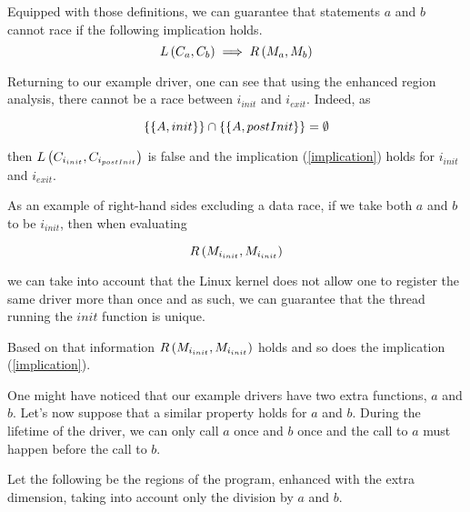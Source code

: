 \documentclass[..thesis.tex]{subfiles}
\begin{document}
Equipped with those definitions, we can guarantee that statements $a$ and $b$
cannot race if the following implication holds.
\begin{equation}
\label{implication}
L \left( C_a, C_b \right) \implies R \left( M_a, M_b \right)  
\end{equation}

Returning to our example driver, one can see that using the enhanced region analysis, there cannot be a race between $i_{init}$ and $i_{exit}$.
Indeed, as

\begin{equation*}
 \left\lbrace \left\lbrace A, init \right\rbrace \right\rbrace \cap  \left\lbrace \left\lbrace A, postInit \right\rbrace \right\rbrace = \emptyset
\end{equation*}

then $L \left( C_{i_{init}}, C_{i_{postInit}} \right)$ is false and the implication (\ref{implication}) holds for $i_{init}$ and $i_{exit}$.

As an example of right-hand sides excluding a data race, if we take both $a$ and $b$ to be $i_{init}$, then when evaluating 

\begin{equation*}
R \left( M_{i_{init}}, M_{i_{init}} \right)
\end{equation*} 

we can take into account that the Linux kernel does not allow one to register the same driver more than once and as such,
we can guarantee that the thread running the $init$ function is unique.

Based on that information $R \left( M_{i_{init}}, M_{i_{init}} \right)$ holds and so does the implication (\ref{implication}).


One might have noticed that our example drivers have two extra functions, $a$ and $b$. Let's now suppose that a similar property holds for $a$ and $b$. During the lifetime of the driver, we can only call $a$ once and $b$ once and the call to $a$  must happen before the call to $b$.

Let the following be the regions of the program, enhanced with the extra dimension, taking into account only the division by $a$ and $b$.


\end{document}
